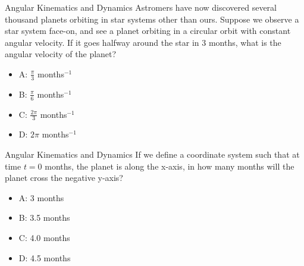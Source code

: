 \documentclass{beamer}
\begin{document}
\begin{frame}{Angular Kinematics and Dynamics}
Astromers have now discovered several thousand planets orbiting in star systems other than ours.  Suppose we observe a star system face-on, and see a planet orbiting in a circular orbit with constant angular velocity.  If it goes halfway around the star in 3 months, what is the angular velocity of the planet?
\begin{itemize}
\item A: $\frac{\pi}{3}$ months$^{-1}$
\item B: $\frac{\pi}{6}$ months$^{-1}$
\item C: $\frac{2\pi}{3}$ months$^{-1}$
\item D: $2\pi$ months$^{-1}$
\end{itemize}
\end{frame}

\begin{frame}{Angular Kinematics and Dynamics}
If we define a coordinate system such that at time $t = 0$ months, the planet is along the x-axis, in how many months will the planet cross the negative y-axis?
\begin{itemize}
\item A: 3 months
\item B: 3.5 months
\item C: 4.0 months
\item D: 4.5 months
\end{itemize}
\end{frame}
\end{document}

